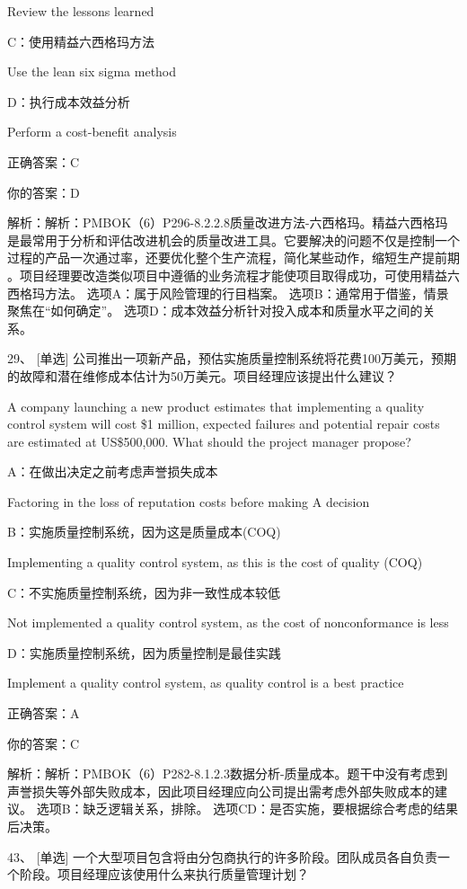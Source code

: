 Review the lessons learned

C：使用精益六西格玛方法

Use the lean six sigma method

D：执行成本效益分析

Perform a cost-benefit analysis

正确答案：C

你的答案：D

解析：解析：PMBOK（6）P296-8.2.2.8质量改进方法-六西格玛。精益六西格玛是最常用于分析和评估改进机会的质量改进工具。它要解决的问题不仅是控制一个过程的产品一次通过率，还要优化整个生产流程，简化某些动作，缩短生产提前期 。项目经理要改造类似项目中遵循的业务流程才能使项目取得成功，可使用精益六西格玛方法。 选项A：属于风险管理的行目档案。 选项B：通常用于借鉴，情景聚焦在“如何确定”。 选项D：成本效益分析针对投入成本和质量水平之间的关系。


29、 [单选] 公司推出一项新产品，预估实施质量控制系统将花费100万美元，预期的故障和潜在维修成本估计为50万美元。项目经理应该提出什么建议？

A company launching a new product estimates that implementing a quality control system will cost \$1 million, expected failures and potential repair costs are estimated at US\$500,000. What should the project manager propose?

A：在做出决定之前考虑声誉损失成本

Factoring in the loss of reputation costs before making A decision

B：实施质量控制系统，因为这是质量成本(COQ)

Implementing a quality control system, as this is the cost of quality (COQ)

C：不实施质量控制系统，因为非一致性成本较低

Not implemented a quality control system, as the cost of nonconformance is less

D：实施质量控制系统，因为质量控制是最佳实践

Implement a quality control system, as quality control is a best practice

正确答案：A

你的答案：C

解析：解析：PMBOK（6）P282-8.1.2.3数据分析-质量成本。题干中没有考虑到声誉损失等外部失败成本，因此项目经理应向公司提出需考虑外部失败成本的建议。 选项B：缺乏逻辑关系，排除。 选项CD：是否实施，要根据综合考虑的结果后决策。


43、 [单选] 一个大型项目包含将由分包商执行的许多阶段。团队成员各自负责一个阶段。项目经理应该使用什么来执行质量管理计划？

